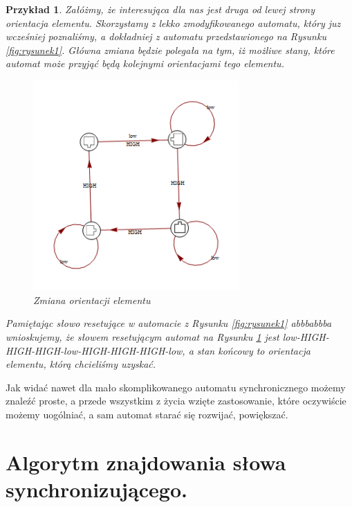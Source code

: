 \documentclass[12pt,a4paper]{article}
\newtheorem{pr}{Przyk{\l}ad}[section]
\begin{document}
\begin{pr}
Za{\l}\'{o}\.{z}my, \.{z}e interesuj\k{a}ca dla nas jest druga od lewej strony orientacja elementu. Skorzystamy z lekko zmodyfikowanego automatu, kt\'{o}ry juz wcze\'{s}niej poznali\'{s}my, a dok{\l}adniej z automatu przedstawionego na Rysunku \ref{fig:rysunek1}. G{\l}\'{o}wna zmiana b\k{e}dzie polega{\l}a na tym, i\.{z} mo\.{z}liwe stany, kt\'{o}re automat mo\.{z}e przyj\k{a}\'{c} b\k{e}d\k{a} kolejnymi orientacjami tego elementu.
\\
\begin{figure}[H]
    \centering
    \includegraphics[width=0.7\textwidth]{rysunek5}
    \caption{Zmiana orientacji elementu}
    \label{fig:rysunek5}
\end{figure}

Pami\k{e}taj\k{a}c s{\l}owo resetuj\k{a}ce w automacie z Rysunku \ref{fig:rysunek1} abbbabbba wnioskujemy, \.{z}e s{\l}owem resetuj\k{a}cym automat na Rysunku \ref{fig:rysunek5} jest low-HIGH-HIGH-HIGH-low-HIGH-HIGH-HIGH-low, a stan ko\'{n}cowy to orientacja elementu, kt\'{o}r\k{a} chcieli\'{s}my uzyska\'{c}.
\end{pr}

Jak wida\'{c} nawet dla ma{\l}o skomplikowanego automatu synchronicznego mo\.{z}emy znale\'{z}\'{c} proste, a przede wszystkim z \.{z}ycia wzi\k{e}te zastosowanie, kt\'{o}re oczywi\'{s}cie mo\.{z}emy uog\'{o}lnia\'{c}, a sam automat stara\'{c} si\k{e} rozwija\'{c}, powi\k{e}ksza\'{c}.


\newpage
\section{Algorytm znajdowania s{\l}owa synchronizuj\k{a}cego.}
\end{document}
